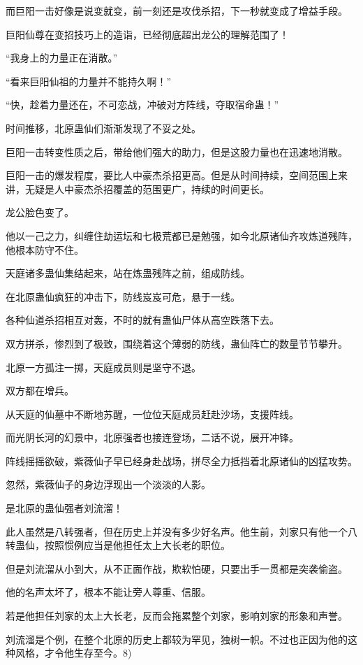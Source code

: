 \begin{this_body}
而巨阳一击好像是说变就变，前一刻还是攻伐杀招，下一秒就变成了增益手段。

巨阳仙尊在变招技巧上的造诣，已经彻底超出龙公的理解范围了！

“我身上的力量正在消散。”

“看来巨阳仙祖的力量并不能持久啊！”

“快，趁着力量还在，不可恋战，冲破对方阵线，夺取宿命蛊！”

时间推移，北原蛊仙们渐渐发现了不妥之处。

巨阳一击转变性质之后，带给他们强大的助力，但是这股力量也在迅速地消散。

巨阳一击的爆发程度，要比人中豪杰杀招更高。但是从时间持续，空间范围上来讲，无疑是人中豪杰杀招覆盖的范围更广，持续的时间更长。

龙公脸色变了。

他以一己之力，纠缠住劫运坛和七极荒都已是勉强，如今北原诸仙齐攻炼道残阵，他根本防守不住。

天庭诸多蛊仙集结起来，站在炼蛊残阵之前，组成防线。

在北原蛊仙疯狂的冲击下，防线岌岌可危，悬于一线。

各种仙道杀招相互对轰，不时的就有蛊仙尸体从高空跌落下去。

双方拼杀，惨烈到了极致，围绕着这个薄弱的防线，蛊仙阵亡的数量节节攀升。

北原一方孤注一掷，天庭成员则是坚守不退。

双方都在增兵。

从天庭的仙墓中不断地苏醒，一位位天庭成员赶赴沙场，支援阵线。

而光阴长河的幻景中，北原强者也接连登场，二话不说，展开冲锋。

阵线摇摇欲破，紫薇仙子早已经身赴战场，拼尽全力抵挡着北原诸仙的凶猛攻势。

忽然，紫薇仙子的身边浮现出一个淡淡的人影。

是北原的蛊仙强者刘流溜！

此人虽然是八转强者，但在历史上并没有多少好名声。他生前，刘家只有他一个八转蛊仙，按照惯例应当是他担任太上大长老的职位。

但是刘流溜从小到大，从不正面作战，欺软怕硬，只要出手一贯都是突袭偷盗。

他的名声太坏了，根本不能让旁人尊重、信服。

若是他担任刘家的太上大长老，反而会拖累整个刘家，影响刘家的形象和声誉。

刘流溜是个例，在整个北原的历史上都较为罕见，独树一帜。不过也正因为他的这种风格，才令他生存至今。8)

\end{this_body}

